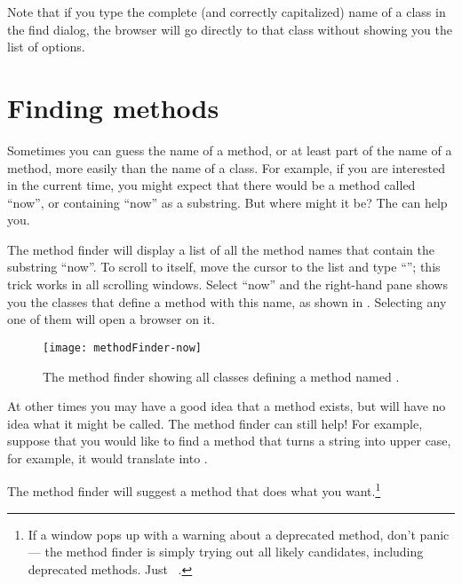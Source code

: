 \documentclass[a4paper,10pt,twoside]{book}
\begin{document}
Note that if you type the complete (and correctly capitalized) name of a class in the find dialog, the browser will go directly to that class without showing you the list of options.

\section{Finding methods}

Sometimes you can guess the name of a method, or at least part of the name of a method, more easily than the name of a class.  For example, if you are interested in the current time, you might expect that there would be a method called ``now'', or containing ``now'' as a substring.   But where might it be?
The  can help you.

The method finder will display a list of all the method names that contain the substring ``now''.  
To scroll to  itself, move the cursor to the list and type ``''; this trick works in all scrolling windows.  Select ``now'' and the right-hand pane shows you the classes that define a method with this name, as shown in .  Selecting any one of them will open a browser on it.

\begin{figure}[hbt]
\centerline {\texttt{[image: methodFinder-now]}}
\caption{The method finder showing all classes defining a method named .
}
\end{figure}

At other times you may have a good idea that a method exists, but will have no idea what it might be called.
The method finder can still help!  For example, suppose that you would like to find a method that turns a string into upper case, for example, it would translate  into .

\noindent
The method finder will suggest a method that does what you want.\footnote{If a window pops up with a warning about a deprecated method, don't panic --- the method finder is simply trying out all likely candidates, including deprecated methods. Just \click ~.}
\end{document}
